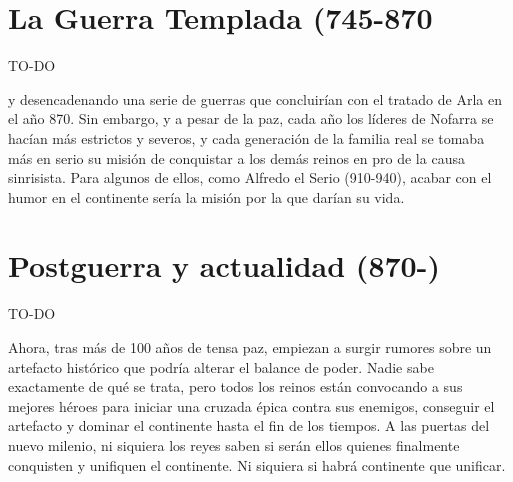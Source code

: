 \section*{La Guerra Templada (745-870}

TO-DO

 y desencadenando una serie de guerras que concluirían con el tratado de Arla en el año 870. Sin embargo, y a pesar de la paz, cada año los líderes de Nofarra se hacían más estrictos y severos, y cada generación de la familia real se tomaba más en serio su misión de conquistar a los demás reinos en pro de la causa sinrisista. Para algunos de ellos, como Alfredo el Serio (910-940), acabar con el humor en el continente sería la misión por la que darían su vida. 

\section*{Postguerra y actualidad (870-)}

TO-DO

Ahora, tras más de 100 años de tensa paz, empiezan a surgir rumores sobre un artefacto histórico que podría alterar el balance de poder. Nadie sabe exactamente de qué se trata, pero todos los reinos están convocando a sus mejores héroes para iniciar una cruzada épica contra sus enemigos, conseguir el artefacto y dominar el continente hasta el fin de los tiempos. A las puertas del nuevo milenio, ni siquiera los reyes saben si serán ellos quienes finalmente conquisten y unifiquen el continente. Ni siquiera si habrá continente que unificar.